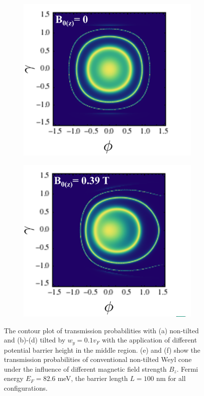 \begin{figure}[H]
        \begin{subfigure}[b]{0.4\linewidth}
            \includegraphics[width = \linewidth]{fig/Chap 2/anomalous5.png}
            \caption{}
            \label{2fig:anomalous5}
        \end{subfigure}
        \begin{subfigure}[b]{0.4\linewidth}
            \includegraphics[width = \linewidth]{fig/Chap 2/anomalous6.png}
            \caption{}
            \label{2fig:anomalous6}
        \end{subfigure}
    \caption{The contour plot of transmission probabilities with (a) non-tilted and (b)-(d) tilted by $w_y = 0.1v_F$
                with the application of different potential barrier height in the middle region. 
                (e) and (f) show the transmission probabilities of conventional non-tilted Weyl cone
                under the influence of different magnetic field strength $B_z$. Fermi energy $E_F = 82.6$ meV, the barrier length
                $L = 100$ nm for all configurations.}
    \label{2fig:anomalous}
    \end{figure}
